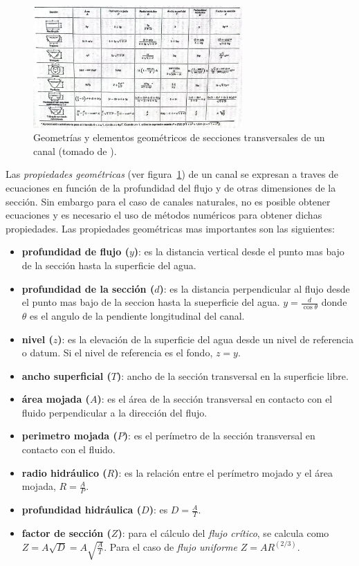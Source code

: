 \documentclass[11pt, oneside]{article}
\begin{document}
\begin{figure}[h]
\centering
\includegraphics[width=8cm]{fig3.jpeg}
\caption{Geometr\'ias y elementos geom\'etricos de secciones transversales de un canal (tomado de \cite{VChow}).}
\label{fig3}
\end{figure}

Las \emph{propiedades geom\'etricas} (ver figura~\ref{fig3}) de un canal se expresan a traves de ecuaciones en funci\'on de la profundidad del flujo y de otras dimensiones de la secci\'on. Sin embargo para el caso de canales naturales, no es posible obtener ecuaciones y es necesario el uso de m\'etodos num\'ericos para obtener dichas propiedades. Las propiedades geom\'etricas mas importantes son las siguientes:
\begin{itemize}
\item \textbf{profundidad de flujo ($y$)}: es la distancia vertical desde el punto mas bajo de la secci\'on hasta la superficie del agua. 
\item \textbf{profundidad de la secci\'on ($d$)}: es la distancia perpendicular al flujo desde el punto mas bajo de la seccion hasta la sueperficie del agua. $y=\frac{d}{\cos \theta}$ donde $\theta$ es el angulo de la pendiente longitudinal del canal. 
\item \textbf{nivel ($z$)}: es la elevaci\'on de la superficie del agua desde un nivel de referencia o datum. Si el nivel de referencia es el fondo, $z=y$.
\item  \textbf{ancho superficial ($T$)}: ancho de la secci\'on transversal en la superficie libre. 
\item  \textbf{\'area mojada ($A$)}: es el \'area de la secci\'on transversal en contacto con el fluido perpendicular a la direcci\'on del flujo. 
\item  \textbf{perimetro mojada ($P$)}: es el per\'imetro de la secci\'on transversal en contacto con el fluido.
\item  \textbf{radio hidr\'aulico ($R$)}: es la relaci\'on entre el per\'imetro mojado y el \'area mojada, $R=\frac{A}{P}$.
\item  \textbf{profundidad hidr\'aulica ($D$)}: es  $D=\frac{A}{T}$.
\item  \textbf{factor de secci\'on ($Z$)}: para el c\'alculo del \emph{flujo cr\'itico}, se calcula como $Z= A\sqrt{D} = A \sqrt{\frac{A}{T}}$. Para el caso de \emph{flujo uniforme} $Z=AR^{(2/3)}$.
\end{itemize}
\end{document}
